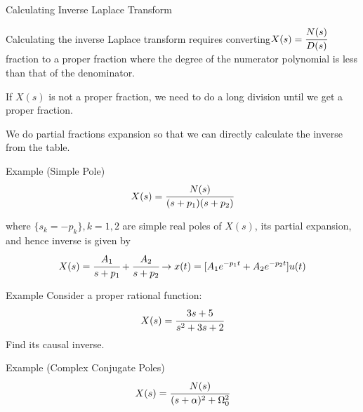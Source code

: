 \documentclass[aspectratio=169,xcolor=dvipsnames,svgnames,x11names,fleqn]{beamer}
\begin{document}
\begin{frame}{}
\vspace*{-9\baselineskip}
    \color{LightGray}{Blank space for calculation}
\end{frame}

\begin{frame}{Calculating Inverse Laplace Transform}

    Calculating the inverse Laplace transform requires converting$ X(s) = \cfrac{N(s)}{D(s)}$ fraction to a proper fraction where the degree of the numerator polynomial is less than that of the denominator.

\begin{gradyellow}
    If $X(s)$ is not a proper fraction, we need to do a long division until we get a proper fraction.

\end{gradyellow}

\begin{gradblue}
    We do partial fractions expansion so that we can directly calculate the inverse from the table.

\end{gradblue}


\end{frame}

\begin{frame}{Example (Simple Pole)}
$$
X(s) = \cfrac{N(s)}{(s+p_1)(s+ p_2)}
$$

where $\{ s_k = -p_k\}, k = 1, 2$ are simple real poles of $X(s)$, its partial expansion, and hence inverse is given by 
$$
X(s) = \cfrac{A_1}{s+ p_1} + \cfrac{A_2}{s+ p_2} \to x(t) =[ A_1e^{-p_1 t} + A_2 e^{-p_2 t} ]u(t)
$$
    
\end{frame}

\begin{frame}{Example}
 \vspace*{-4\baselineskip}
    Consider a proper rational function:
    $$
    X(s) = \cfrac{3s + 5}{s^2 + 3s + 2}
    $$
    Find its causal inverse.
    
\end{frame}

\begin{frame}{}
\vspace*{-9\baselineskip}
    \color{LightGray}{Blank space for calculation}
\end{frame}

\begin{frame}{Example (Complex Conjugate Poles)}
 \vspace*{-6\baselineskip}
$$
X(s) = \cfrac{N(s)}{(s+ \alpha)^2  + \Omega_0^2}
$$

    
\end{frame}
\end{document}
